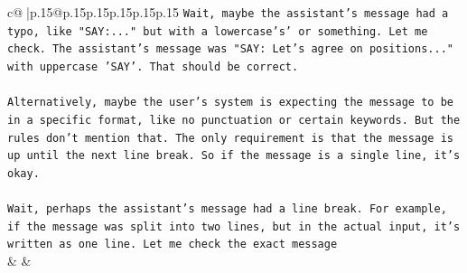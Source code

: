 \documentclass{article}
\begin{document}
{\begin{supertabular}{c@{$\;$}|p{.15\linewidth}@{}p{.15\linewidth}p{.15\linewidth}p{.15\linewidth}p{.15\linewidth}p{.15\linewidth}}
{{{\texttt{Wait, maybe the assistant's message had a typo, like "SAY:..." but with a lowercase's' or something. Let me check. The assistant's message was "SAY: Let's agree on positions..." with uppercase 'SAY'. That should be correct.} \\
\\ 
\texttt{Alternatively, maybe the user's system is expecting the message to be in a specific format, like no punctuation or certain keywords. But the rules don't mention that. The only requirement is that the message is up until the next line break. So if the message is a single line, it's okay.} \\
\\ 
\texttt{Wait, perhaps the assistant's message had a line break. For example, if the message was split into two lines, but in the actual input, it's written as one line. Let me check the exact message} \\
            }
        }
    }
    & & \\ \\


\end{supertabular}}
\end{document}
